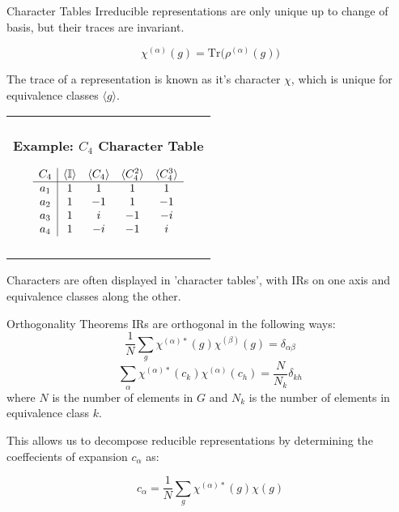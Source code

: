 \documentclass[11pt]{beamer}
\newenvironment{boxed2}
    {\begin{center}
    \begin{tabular}{|p{0.95\textwidth}|}
    \hline\\
    }
    { 
    \\\\\hline
    \end{tabular} 
    \end{center}
    }
\begin{document}
\begin{frame}{Character Tables}
	Irreducible representations are only unique up to change of basis, but their traces are invariant.
	
	$$
	\chi^{(\alpha)}(g)= \text{Tr}\big(\rho^{(\alpha)}(g)\big)
	$$
	
	The trace of a representation is known as it's character $\chi$, which is unique for equivalence classes $\langle g \rangle$.
	
	
		\begin{boxed2}
		
		\vspace{-.57cm}
		
		\textbf{Example: $C_4$ Character Table}
		
		\vspace{-.12cm}
		
		$$
		\begin{array}{c|c c c c}
			C_4 & \langle \mathbb{I}\rangle  & \langle C_4\rangle  & \langle C_4^2\rangle  & \langle C_4^3\rangle \\
			\hline 
			a_1 & 1 & 1 & 1 & 1 \\
			a_2 & 1 & -1 & 1 & -1 \\
			a_3 & 1 & i & -1 & -i \\
			a_4 & 1 & -i & -1 & i \\
		\end{array}
		$$
		
		\vspace{-.3cm}
		
	\end{boxed2}
		
	Characters are often displayed in 'character tables', with IRs on one axis and equivalence classes along the other.
	
\end{frame}

\begin{frame}{Orthogonality Theorems}
	IRs are orthogonal in the following ways:
	$$
	\frac{1}{N}\sum_{g}\chi^{(\alpha)*}(g)\chi^{(\beta)}(g) = \delta_{\alpha\beta}
	$$
	$$
	\sum_{\alpha}\chi^{(\alpha)*}(c_k)\chi^{(\alpha)}(c_h)= \frac{N}{N_k}\delta_{kh}
	$$
	where $N$ is the number of elements in $G$ and $N_k$ is the number of elements in equivalence class $k$.
	
	\medskip
	
	This allows us to decompose reducible representations by determining the coeffecients of expansion $c_{\alpha}$ as:
	
	$$
	c_{\alpha} = \frac{1}{N}\sum_{g}\chi^{(\alpha)*}(g)\chi(g)
	$$ 
\end{frame}
\end{document}
